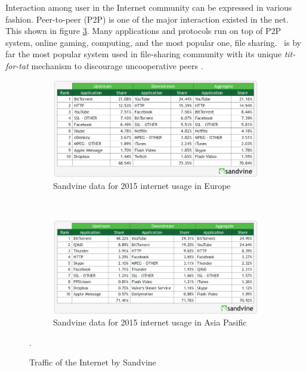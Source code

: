 Interaction among user in the Internet community can be expressed in various fashion. Peer-to-peer (P2P) is one of the major interaction existed in the net. This shown in figure \ref{fig:usage}. Many applications and protocols run on top of P2P system, online gaming, computing, and the most popular one, file sharing. \bt~is by far the most popular system used in file-sharing community with its unique \textit{tit-for-tat} mechanism to discourage uncooperative peers \cite{2003:bittorrent:cohen}. 

\begin{figure}[h]
	\centering
	\begin{subfigure}[b]{0.8\textwidth}
		\includegraphics[width=\linewidth]{pics/sandvineeu2015}
		\caption{Sandvine data for 2015 internet usage in Europe}
		\label{fig:usage1}
	\end{subfigure}\\
	\begin{subfigure}[b]{0.8\textwidth}
		\includegraphics[width=\linewidth]{pics/sandvineasia2015}
		\caption{Sandvine data for 2015 internet usage in Asia Pasific}
		\label{fig:usage2}
	\end{subfigure}%
	\caption{Traffic of the Internet by Sandvine \cite{2015:internettraffic:sandvine}}.
	\label{fig:usage}
\end{figure}


